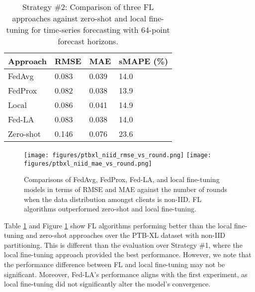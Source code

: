 \begin{table}
  \caption{{Strategy \#2: Comparison of three FL approaches against zero-shot and local fine-tuning for time-series forecasting with 64-point forecast horizons.}}
  \label{tab:strategy_2_summary}
  \centering
  \begin{tabular}{l l l l}
    \toprule 
    Approach            & RMSE      & MAE     & sMAPE (\%)  \\
    \midrule
    
    FedAvg             & 0.083     & 0.039   & 14.0       \\
    FedProx            & 0.082     & 0.038   & 13.9      \\
    Local              & 0.086     & 0.041   & 14.9       \\
    Fed-LA              & 0.083     & 0.038   & 14.0       \\
    Zero-shot          & 0.146     & 0.076    & 23.6        \\
    \bottomrule
  \end{tabular}
\end{table}

\begin{figure}
  \texttt{[image: figures/ptbxl\_niid\_rmse\_vs\_round.png]}
  \texttt{[image: figures/ptbxl\_niid\_mae\_vs\_round.png]}
  \caption{{Comparisons of FedAvg, FedProx, Fed-LA, and local fine-tuning models in terms of RMSE and MAE against the number of rounds when the data distribution amongst clients is non-IID. 
  FL algorithms outperformed zero-shot and local fine-tuning.}}
  \label{figs:ptbxl_niid_comparison}
\end{figure}


Table \ref{tab:strategy_2_summary} and Figure \ref{figs:ptbxl_niid_comparison} show FL algorithms performing better than the local fine-tuning and zero-shot approaches over the PTB-XL dataset with non-IID partitioning.
This is different than the evaluation over Strategy \#1, where the local fine-tuning approach provided the best performance.
However, we note that the performance difference between FL and local fine-tuning may not be significant.
Moreover, Fed-LA's performance aligns with the first experiment, as local fine-tuning did not significantly alter the model's convergence.

